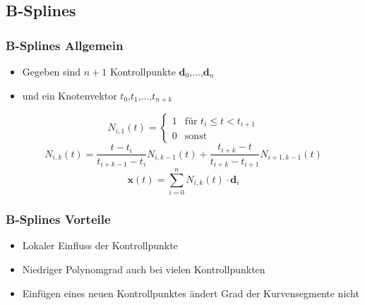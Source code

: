 \documentclass[11pt]{beamer}
\begin{document}
\subsection{B-Splines}

\begin{frame}
\frametitle{B-Splines Allgemein}
\begin{itemize}
\item Gegeben sind $n+1$ Kontrollpunkte $\mathbf{d}_0 \text{,}\dots\text{,} \mathbf{d}_n$
\item und ein Knotenvektor $t_0\text{,} t_1\text{,} \dots \text{,} t_{n+k}$
\end{itemize}
\bigskip
\begin{equation}
N_{i,1}(t) = \begin{cases}
                1 & \text{für } t_{i} \leq t < t_{i+1} \\
                0 & \text{sonst}
             \end{cases}
\end{equation}
\begin{equation}
N_{i,k}(t) = \frac{t - t_{i}}{t_{i+k-1} - t_{i}}N_{i,k-1}(t) + \frac{t_{i+k} - t}{t_{i+k} - t_{i+1}}N_{i+1,k-1}(t)
\end{equation}
\bigskip
\begin{equation}
\boxed{\mathbf{x}(t) = \sum_{i = 0}^{n} N_{i,k}(t) \cdot \mathbf{d}_{i}}
\end{equation}

\end{frame}


\begin{frame}
\frametitle{B-Splines Vorteile}
\begin{itemize}
\item Lokaler Einfluss der Kontrollpunkte
\item Niedriger Polynomgrad auch bei vielen Kontrollpunkten
\item Einfügen eines neuen Kontrollpunktes ändert Grad der Kurvensegmente nicht
\end{itemize}
\end{frame}
\end{document}
